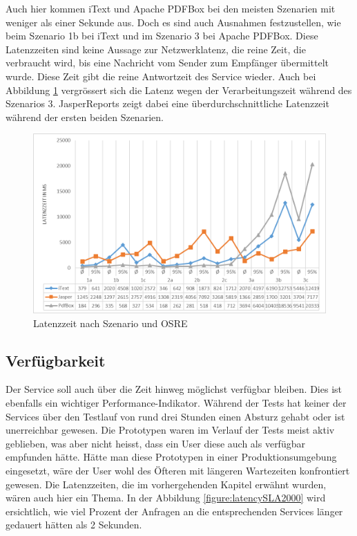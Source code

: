 \documentclass[main.tex]{subfiles}
\begin{document}
Auch hier kommen iText und Apache PDFBox bei den meisten Szenarien mit weniger als einer Sekunde aus. Doch es sind auch Ausnahmen festzustellen, wie beim Szenario 1b bei iText und im Szenario 3 bei Apache PDFBox. Diese Latenzzeiten sind keine Aussage zur Netzwerklatenz, die reine Zeit, die verbraucht wird, bis eine Nachricht vom Sender zum Empfänger übermittelt wurde. Diese Zeit gibt die reine Antwortzeit des Service wieder. Auch bei Abbildung \ref{figure:latencySzenario} vergrössert sich die Latenz wegen der Verarbeitungszeit während des Szenarios 3. JasperReports zeigt dabei eine überdurchschnittliche Latenzzeit während der ersten beiden Szenarien.

\begin{figure}[!ht]
\includegraphics[width=\textwidth]{mainpart/4_analyse_img/LatenzzeitSzen.png}
 \caption{Latenzzeit nach Szenario und OSRE}
 \label{figure:latencySzenario}
\end{figure}

\subsection{Verfügbarkeit}

Der Service soll auch über die Zeit hinweg möglichst verfügbar bleiben. Dies ist ebenfalls ein wichtiger Performance-Indikator. Während der Tests hat keiner der Services über den Testlauf von rund drei Stunden einen Absturz gehabt oder ist unerreichbar gewesen. Die Prototypen waren im Verlauf der Tests meist aktiv geblieben, was aber nicht heisst, dass ein User diese auch als verfügbar empfunden hätte. Hätte man diese Prototypen in einer Produktionsumgebung eingesetzt, wäre der User wohl des Öfteren mit längeren Wartezeiten konfrontiert gewesen. 
Die Latenzzeiten, die im vorhergehenden Kapitel erwähnt wurden, wären auch hier ein Thema. In der Abbildung \ref{figure:latencySLA2000} wird ersichtlich, wie viel Prozent der Anfragen an die entsprechenden Services länger gedauert hätten als 2 Sekunden.
\end{document}
